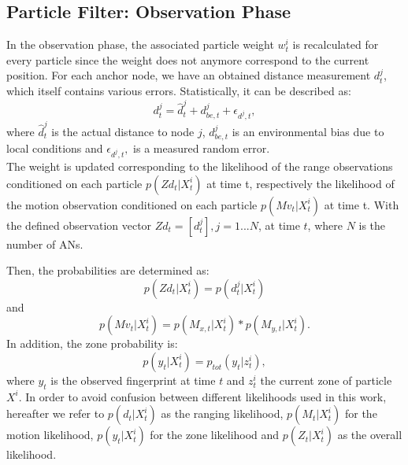 \subsection{Particle Filter: Observation Phase}
In the observation phase, the associated particle weight $w^{i}_{t}$ is recalculated for every particle since the weight does not anymore correspond to the current position. For each anchor node, we have an obtained distance measurement $d^{j}_{t}$, which itself contains various errors. Statistically, it can be described as: 
\begin{equation}
d^{j}_{t} = \hat{d}^{j}_{t} + d^{j}_{be, t} + \epsilon_{d^{j}, t},
\label{eqn:distances}
\end{equation}
where $\hat{d}^{j}_{t}$ is the actual distance to node $j$, $d^{j}_{be, t}$ is an environmental bias due to local conditions and $\epsilon_{d^{j}, t},$ is a measured random error.\\
\noindent\hspace*{5mm}%
The weight is updated corresponding to the likelihood of the range observations conditioned on each particle $p(Zd_{t} | X^{i}_{t})$ at time t, respectively the likelihood of the motion observation conditioned on each particle $p(Mv_{t} | X^{i}_{t})$ at time t. With the defined observation vector $Zd_{t} = [d_{t}^{j}], j = 1...N$, at time $t$, where $N$ is the number of
ANs.


 Then, the probabilities are determined as:
\begin{equation}
p(Zd_{t} | X^{i}_{t}) = p(d_{t}^{j} | X^{i}_{t})
\label{eqn:probability_distance}
\end{equation}
and
\begin{equation}
p(Mv_{t} | X^{i}_{t}) = p(M_{x,t} | X^{i}_{t}) * p(M_{y,t} | X^{i}_{t}).
\label{eqn:probability_movement}
\end{equation}
In addition, the zone probability is:
\begin{equation}
p(y_t | X^{i}_{t}) = p_{tot}(y_{t} | z^{i}_{t}),
\label{eqn:probability_zone}
\end{equation}
where $y_t$ is the observed fingerprint at time $t$ and $z^{i}_{t}$ the current zone of particle $X^{i}$.
In order to avoid confusion between different likelihoods used in this work, hereafter we refer to $p(d_{t} | X^{i}_{t})$ as the ranging likelihood, $p(M_{t} | X^{i}_{t})$ for the motion likelihood, $p(y_t | X^{i}_{t})$ for the zone likelihood and $p(Z_{t} | X^{i}_{t})$ as the overall likelihood.

